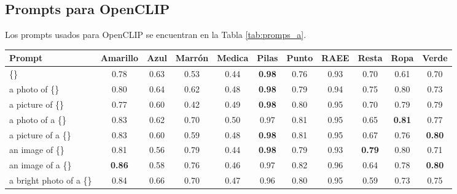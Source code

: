\documentclass[10pt,a4paper,twocolumn,twoside]{article}
\begin{document}
\subsection{Prompts para OpenCLIP}

Los prompts usados para OpenCLIP se encuentran en la Tabla \ref{tab:promps_a}.

\begin{table}[h]
  \begin{tabular}{lcccccccccc}
  \hline
  Prompt                                          & Amarillo      & Azul          & Marrón        & Medica        & Pilas         & Punto         & RAEE          & Resta         & Ropa          & Verde         \\ \hline
  \{\}                                            & 0.78          & 0.63          & 0.53          & 0.44          & \textbf{0.98} & 0.76          & 0.93          & 0.70          & 0.61          & 0.70          \\
  a   photo of \{\}                               & 0.80          & 0.64          & 0.62          & 0.48          & \textbf{0.98} & 0.79          & 0.94          & 0.75          & 0.80          & 0.73          \\
  a   picture of \{\}                             & 0.77          & 0.60          & 0.42          & 0.49          & \textbf{0.98} & 0.80          & 0.95          & 0.70          & 0.79          & 0.79          \\
  a   photo of a \{\}                             & 0.83          & 0.62          & 0.70          & 0.50          & 0.97          & 0.81          & 0.95          & 0.65          & \textbf{0.81} & 0.77          \\
  a   picture of a \{\}                           & 0.83          & 0.60          & 0.59          & 0.48          & \textbf{0.98} & 0.81          & 0.95          & 0.67          & 0.76          & \textbf{0.80} \\
  an   image of \{\}                              & 0.81          & 0.56          & 0.79          & 0.44          & \textbf{0.98} & 0.79          & 0.93          & \textbf{0.79} & 0.80          & 0.71          \\
  an   image of a \{\}                            & \textbf{0.86} & 0.58          & 0.76          & 0.46          & 0.97          & 0.82          & 0.96          & 0.64          & 0.78          & \textbf{0.80} \\
  a bright photo of a \{\}                        & 0.84          & 0.66          & 0.70          & 0.47          & 0.96          & 0.80          & 0.95          & 0.59          & 0.73          & 0.75          \\

\end{tabular}
\end{table}
\end{document}
